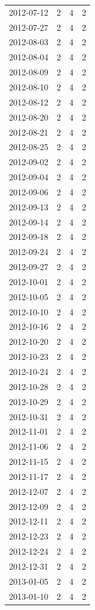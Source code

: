 \begin{tabular}{lrrr}
2012-07-12 & 2 & 4 & 2 \\
2012-07-27 & 2 & 4 & 2 \\
2012-08-03 & 2 & 4 & 2 \\
2012-08-04 & 2 & 4 & 2 \\
2012-08-09 & 2 & 4 & 2 \\
2012-08-10 & 2 & 4 & 2 \\
2012-08-12 & 2 & 4 & 2 \\
2012-08-20 & 2 & 4 & 2 \\
2012-08-21 & 2 & 4 & 2 \\
2012-08-25 & 2 & 4 & 2 \\
2012-09-02 & 2 & 4 & 2 \\
2012-09-04 & 2 & 4 & 2 \\
2012-09-06 & 2 & 4 & 2 \\
2012-09-13 & 2 & 4 & 2 \\
2012-09-14 & 2 & 4 & 2 \\
2012-09-18 & 2 & 4 & 2 \\
2012-09-24 & 2 & 4 & 2 \\
2012-09-27 & 2 & 4 & 2 \\
2012-10-01 & 2 & 4 & 2 \\
2012-10-05 & 2 & 4 & 2 \\
2012-10-10 & 2 & 4 & 2 \\
2012-10-16 & 2 & 4 & 2 \\
2012-10-20 & 2 & 4 & 2 \\
2012-10-23 & 2 & 4 & 2 \\
2012-10-24 & 2 & 4 & 2 \\
2012-10-28 & 2 & 4 & 2 \\
2012-10-29 & 2 & 4 & 2 \\
2012-10-31 & 2 & 4 & 2 \\
2012-11-01 & 2 & 4 & 2 \\
2012-11-06 & 2 & 4 & 2 \\
2012-11-15 & 2 & 4 & 2 \\
2012-11-17 & 2 & 4 & 2 \\
2012-12-07 & 2 & 4 & 2 \\
2012-12-09 & 2 & 4 & 2 \\
2012-12-11 & 2 & 4 & 2 \\
2012-12-23 & 2 & 4 & 2 \\
2012-12-24 & 2 & 4 & 2 \\
2012-12-31 & 2 & 4 & 2 \\
2013-01-05 & 2 & 4 & 2 \\
2013-01-10 & 2 & 4 & 2 \\

\end{tabular}
